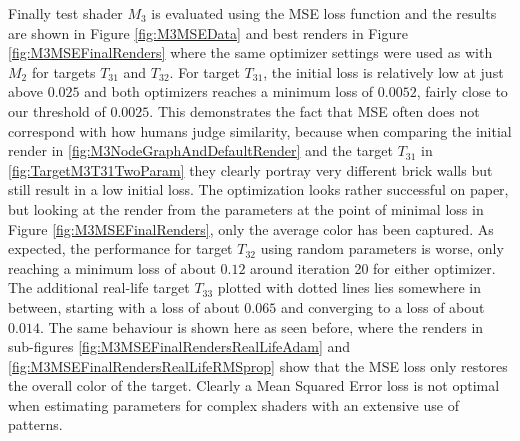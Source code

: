 Finally test shader $M_3$ is evaluated using the MSE loss function and the results are shown in Figure \ref{fig:M3MSEData} and best renders in Figure \ref{fig:M3MSEFinalRenders} where the same optimizer settings were used as with $M_2$ for targets $T_{31}$ and $T_{32}$. For target $T_{31}$, the initial loss is relatively low at just above $0.025$ and both optimizers reaches a minimum loss of $0.0052$, fairly close to our threshold of $0.0025$. This demonstrates the fact that MSE often does not correspond with how humans judge similarity, because when comparing the initial render in \ref{fig:M3NodeGraphAndDefaultRender} and the target $T_{31}$ in \ref{fig:TargetM3T31TwoParam} they clearly portray very different brick walls but still result in a low initial loss. The optimization looks rather successful on paper, but looking at the render from the parameters at the point of minimal loss in Figure \ref{fig:M3MSEFinalRenders}, only the average color has been captured. As expected, the performance for target $T_{32}$ using random parameters is worse, only reaching a minimum loss of about $0.12$ around iteration 20 for either optimizer. The additional real-life target $T_{33}$ plotted with dotted lines lies somewhere in between, starting with a loss of about $0.065$ and converging to a loss of about $0.014$. The same behaviour is shown here as seen before, where the renders in sub-figures \ref{fig:M3MSEFinalRendersRealLifeAdam} and \ref{fig:M3MSEFinalRendersRealLifeRMSprop} show that the MSE loss only restores the overall color of the target. Clearly a Mean Squared Error loss is not optimal when estimating parameters for complex shaders with an extensive use of patterns.  
